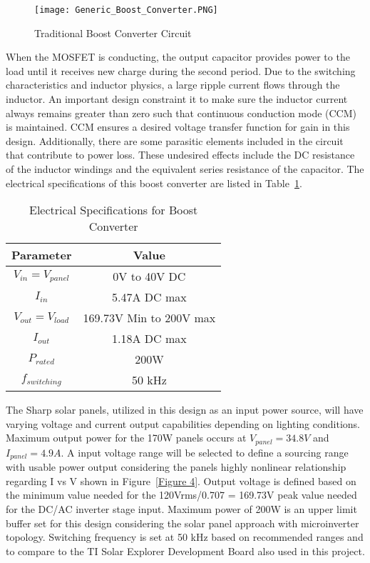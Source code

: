 \begin{figure}
\centering
\texttt{[image: Generic\_Boost\_Converter.PNG]}
\caption{Traditional Boost Converter Circuit}
\label{Figure 3}
\end{figure}


When the MOSFET is conducting, the output capacitor provides power to the load until it receives new charge during the second period. Due to the switching characteristics and inductor physics, a large ripple current flows through the inductor. An important design constraint it to make sure the inductor current always remains greater than zero such that continuous conduction mode (CCM) is maintained. CCM ensures a desired voltage transfer function for gain in this design. Additionally, there are some parasitic elements included in the circuit that contribute to power loss. These undesired effects include the DC resistance of the inductor windings and the equivalent series resistance of the capacitor.  
The electrical specifications of this boost converter are listed in Table~\ref{Table 1}. \\ 


\begin{table}
\centering
\begin{tabular}{|c|c|}
\hline
 Parameter & Value \\
 \hline
 $ V_{in} = V_{panel}$ & 0V to 40V DC \\
 \hline
 $ I_{in}$ & 5.47A DC max \\
 \hline
 $ V_{out}=V_{load} $ & 169.73V Min to 200V max \\
 \hline
 $ I_{out} $ & 1.18A DC max \\
 \hline
 $ P_{rated} $ & 200W \\
 \hline
 $ f_{switching} $ & 50 kHz \\
 \hline
\end{tabular}
\caption{Electrical Specifications for Boost Converter}
\label{Table 1}
\end{table}

The Sharp solar panels, utilized in this design as an input power source, will have varying voltage and current output capabilities depending on lighting conditions. Maximum output power for the 170W panels occurs at $V_{panel}=34.8V$ and  $I_{panel} = 4.9A$. A input voltage range will be selected to define a sourcing range with usable power output considering the panels highly nonlinear relationship regarding I vs V shown in Figure~\ref{Figure 4}. Output voltage is defined based on the minimum value needed for the 120Vrms/0.707 = 169.73V peak value needed for the DC/AC inverter stage input. Maximum power of 200W is an upper limit buffer set for this design considering the solar panel approach with microinverter topology. Switching frequency is set at 50 kHz based on recommended ranges and to compare to the TI Solar Explorer Development Board also used in this project.\cite{SharpPanel}

